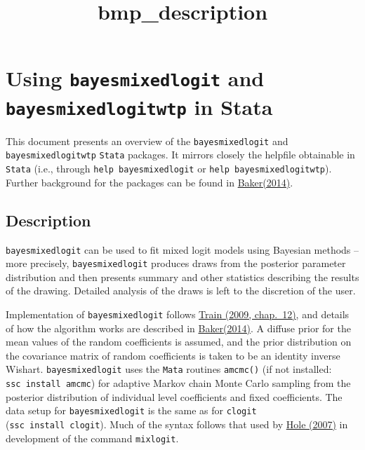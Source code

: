 \documentclass[11pt]{article}
\title{bmp\_description}
\begin{document}
    
    \maketitle
    
    

    
    \hypertarget{using-bayesmixedlogit-and-bayesmixedlogitwtp-in-stata}{%
\section{\texorpdfstring{Using \texttt{bayesmixedlogit} and
\texttt{bayesmixedlogitwtp} in
Stata}{Using bayesmixedlogit and bayesmixedlogitwtp in Stata}}\label{using-bayesmixedlogit-and-bayesmixedlogitwtp-in-stata}}

This document presents an overview of the \texttt{bayesmixedlogit} and
\texttt{bayesmixedlogitwtp} \texttt{Stata} packages. It mirrors closely
the helpfile obtainable in \texttt{Stata} (i.e., through
\texttt{help\ bayesmixedlogit} or \texttt{help\ bayesmixedlogitwtp}).
Further background for the packages can be found in
\href{https://www.stata-journal.com/article.html?article=st0354}{Baker(2014)}.

    \hypertarget{description}{%
\subsection{Description}\label{description}}

\texttt{bayesmixedlogit} can be used to fit mixed logit models using
Bayesian methods -- more precisely, \texttt{bayesmixedlogit} produces
draws from the posterior parameter distribution and then presents
summary and other statistics describing the results of the drawing.
Detailed analysis of the draws is left to the discretion of the user.

Implementation of \texttt{bayesmixedlogit} follows
\href{https://eml.berkeley.edu/books/choice2.html}{Train (2009,
chap.~12)}, and details of how the algorithm works are described in
\href{https://www.stata-journal.com/article.html?article=st0354}{Baker(2014)}.
A diffuse prior for the mean values of the random coefficients is
assumed, and the prior distribution on the covariance matrix of random
coefficients is taken to be an identity inverse Wishart.
\texttt{bayesmixedlogit} uses the \texttt{Mata} routines
\texttt{amcmc()} (if not installed: \texttt{ssc\ install\ amcmc}) for
adaptive Markov chain Monte Carlo sampling from the posterior
distribution of individual level coefficients and fixed coefficients.
The data setup for \texttt{bayesmixedlogit} is the same as for
\texttt{clogit} (\texttt{ssc\ install\ clogit}). Much of the syntax
follows that used by
\href{https://www.stata-journal.com/article.html?article=st0133}{Hole
(2007)} in development of the command \texttt{mixlogit}.
\end{document}
